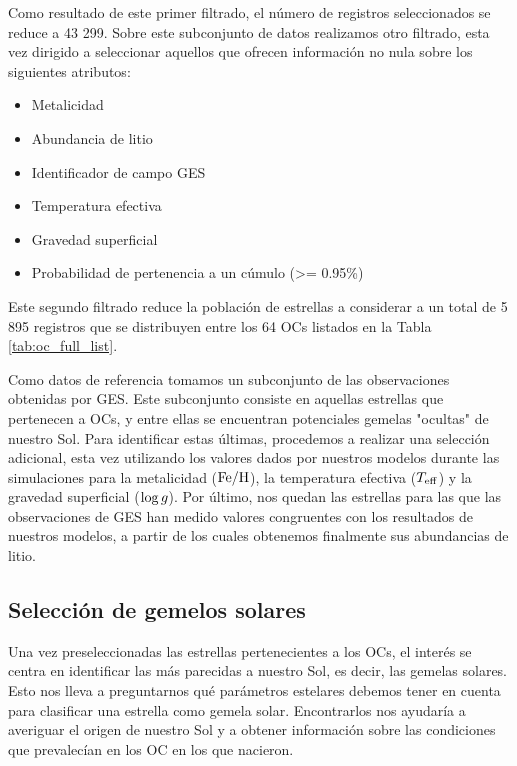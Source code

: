 Como resultado de este primer filtrado, el número de registros seleccionados se reduce a 43 299. Sobre este subconjunto de datos realizamos otro filtrado, esta vez dirigido a seleccionar aquellos que ofrecen información no nula sobre los siguientes atributos:

\begin{itemize}
	\item Metalicidad
	\item Abundancia de litio
	\item Identificador de campo GES
	\item Temperatura efectiva
	\item Gravedad superficial
	\item Probabilidad de pertenencia a un cúmulo (>= 0.95\%)
\end{itemize}

Este segundo filtrado reduce la población de estrellas a considerar a un total de 5 895 registros que se distribuyen entre los 64 OCs listados en la Tabla \ref{tab:oc_full_list}.\par

Como datos de referencia tomamos un subconjunto de las observaciones obtenidas por GES. Este subconjunto consiste en aquellas estrellas que pertenecen a OCs, y entre ellas se encuentran potenciales gemelas "ocultas" de nuestro Sol. Para identificar estas últimas, procedemos a realizar una selección adicional, esta vez utilizando los valores dados por nuestros modelos durante las simulaciones para la metalicidad ($\mathrm{Fe}/\mathrm{H}$), la temperatura efectiva ($T_{\mathrm{eff}}$) y la gravedad superficial ($\mathrm{log} \, g$). Por último, nos quedan las estrellas para las que las observaciones de GES han medido valores congruentes con los resultados de nuestros modelos, a partir de los cuales obtenemos finalmente sus abundancias de litio.\par

\subsection{Selección de gemelos solares} \label{sec:gemelos_solares}
Una vez preseleccionadas las estrellas pertenecientes a los OCs, el interés se centra en identificar las más parecidas a nuestro Sol, es decir, las gemelas solares. Esto nos lleva a preguntarnos qué parámetros estelares debemos tener en cuenta para clasificar una estrella como gemela solar. Encontrarlos nos ayudaría a averiguar el origen de nuestro Sol y a obtener información sobre las condiciones que prevalecían en los OC en los que nacieron.\par

